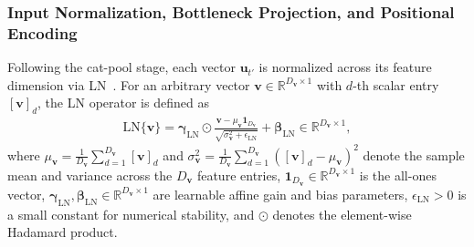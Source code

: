 \documentclass[lettersize,journal]{IEEEtran}
\begin{document}
\subsubsection{Input Normalization, Bottleneck Projection, and Positional Encoding}
\label{sec:bottleneck_pe}
Following the cat-pool stage, each vector $\mathbf{u}_{t'}$ is normalized across its feature dimension via \gls{LN}~\cite{ba2016layer}. For an arbitrary vector $\mathbf{v} \in \mathbb{R}^{D_{\mathbf{v}} \times 1}$ with $d$-th scalar entry $[\mathbf{v}]_d$, the \gls{LN} operator is defined as
\begin{align}
  \mathrm{LN}\{\mathbf{v}\} = \bm{\gamma}_{\mathrm{LN}} \odot \frac{\mathbf{v} - \mu_{\mathbf{v}} \mathbf{1}_{D_{\mathbf{v}}}}{\sqrt{\sigma_{\mathbf{v}}^2 + \epsilon_{\mathrm{LN}}}} + \bm{\beta}_{\mathrm{LN}} \in \mathbb{R}^{D_{\mathbf{v}} \times 1},
  \label{eq:layernorm_def}
\end{align}
where $\mu_{\mathbf{v}} = \frac{1}{D_{\mathbf{v}}}\sum_{d=1}^{D_{\mathbf{v}}} [\mathbf{v}]_d$ and $\sigma_{\mathbf{v}}^2 = \frac{1}{D_{\mathbf{v}}}\sum_{d=1}^{D_{\mathbf{v}}} ([\mathbf{v}]_d - \mu_{\mathbf{v}})^2$ denote the sample mean and variance across the $D_{\mathbf{v}}$ feature entries, $\mathbf{1}_{D_{\mathbf{v}}} \in \mathbb{R}^{D_{\mathbf{v}} \times 1}$ is the all-ones vector, $\bm{\gamma}_{\mathrm{LN}}, \bm{\beta}_{\mathrm{LN}} \in \mathbb{R}^{D_{\mathbf{v}} \times 1}$ are learnable affine gain and bias parameters, $\epsilon_{\mathrm{LN}} > 0$ is a small constant for numerical stability, and $\odot$ denotes the element-wise Hadamard product.
\end{document}
